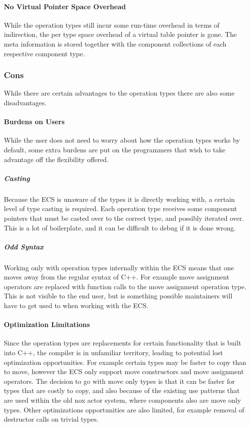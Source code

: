 \paragraph{No Virtual Pointer Space Overhead}
While the operation types still incur some run-time overhead in terms of indirection,
the per type space overhead of a virtual table pointer is gone.
The meta information is stored together with the component collections of each respective component type.

\subsubsection{Cons}
While there are certain advantages to the operation types there are also some disadvantages.

\paragraph{Burdens on Users}
While the user does not need to worry about how the operation types works by default,
some extra burdens are put on the programmers that wish to take advantage off the flexibility offered.

\subparagraph{Casting}
Because the ECS is unaware of the types it is directly working with, a certain level of type casting is required.
Each operation type receives some component pointers that must be casted over to the correct type,
and possibly iterated over. This is a lot of boilerplate, and it can be difficult to debug if it is done wrong.

\subparagraph{Odd Syntax}
Working only with operation types internally within the ECS means that one moves away from the regular syntax of C++.
For example move assignment operators are replaced with function calls to the move assignment operation type.
This is not visible to the end user, but is something possible maintainers will have to get used to when working with the ECS.

\paragraph{Optimization Limitations}
Since the operation types are replacements for certain functionality that is built into C++, the compiler is in
unfamiliar territory, leading to potential lost optimization opportunities.
For example certain types may be faster to copy than to move, however the ECS only support move constructors
and move assignment operators.
The decision to go with move only types is that it can be faster for types that are costly to copy,
and also because of the existing use patterns that are used within the old nox actor system, where components
also are move only types.
Other optimizations opportunities are also limited, for example removal of destructor calls on trivial types.

